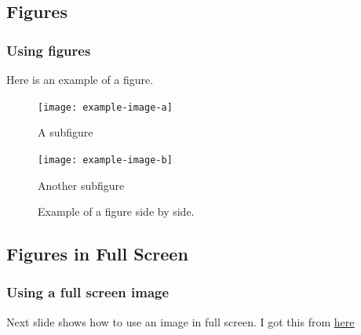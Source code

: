 \documentclass[
	10pt, %
	aspectratio=169, %
]{beamer}
\begin{document}
\subsection{Figures}
\begin{frame}
	\frametitle{Using figures}
	Here is an example of a figure.
	\begin{figure}
		\centering
		\begin{minipage}{.5\textwidth}
			\centering
			\texttt{[image: example-image-a]}
			\caption{A subfigure}
		\end{minipage}%
		\begin{minipage}{.5\textwidth}
			\centering
			\texttt{[image: example-image-b]}
			\caption{Another subfigure}
		\end{minipage}
		\caption{Example of a figure side by side.}
	\end{figure}
\end{frame}

\subsection{Figures in Full Screen}
\begin{frame}
	\frametitle{Using a full screen image}
	Next slide shows how to use an image in full screen.
	I got this from
	\href{
		https://tex.stackexchange.com/questions/3915/image-on-full-slide-in-beamer-package
	}{\color{RPIred}\underline{here}}
\end{frame}

{
\begin{frame}[plain]
\end{frame}
}
\end{document}
